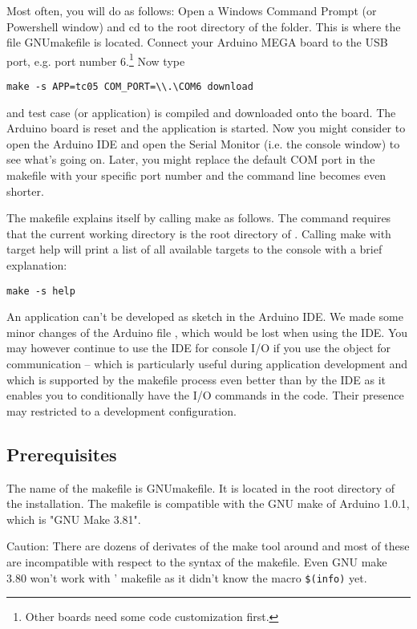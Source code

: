 Most often, you will do as follows: Open a Windows Command Prompt (or
Powershell window) and cd to the root directory of the \rtos{} folder.
This is where the file GNUmakefile is located. Connect your Arduino MEGA
board to the USB port, e.g. port number 6.\footnote{Other boards need some
code customization first.} Now type

\verb+make -s APP=tc05 COM_PORT=\\.\COM6 download+

and test case (or application)  is compiled and downloaded
onto the board. The Arduino board is reset and the \rtos{} application is
started. Now you might consider to open the Arduino IDE and open the
Serial Monitor (i.e. the console window) to see what's going on. Later,
you might replace the default COM port in the makefile with your specific
port number and the command line becomes even shorter.

The makefile explains itself by calling make as follows. The command
requires that the current working directory is the root directory of
\rtos{}. Calling make with target help will print a list of all available
targets to the console with a brief explanation:

\verb+make -s help+

An \rtos{} application can't be developed as sketch in the Arduino IDE. We
made some minor changes of the Arduino file , which would be
lost when using the IDE. You may however continue to use the IDE for
console I/O if you use the object  for communication --
which is particularly useful during application development and which is
supported by the makefile process even better than by the IDE as it
enables you to conditionally have the I/O commands in the code. Their
presence may restricted to a development configuration.


\subsection{Prerequisites}

The name of the makefile is GNUmakefile. It is located in the root
directory of the \rtos{} installation. The makefile is compatible with the
GNU make of Arduino 1.0.1, which is "GNU Make 3.81".

Caution: There are dozens of derivates of the make tool around and most
of these are incompatible with respect to the syntax of the makefile. Even
GNU make 3.80 won't work with \rtos' makefile as it didn't know the
macro \verb+$(info)+ yet.

